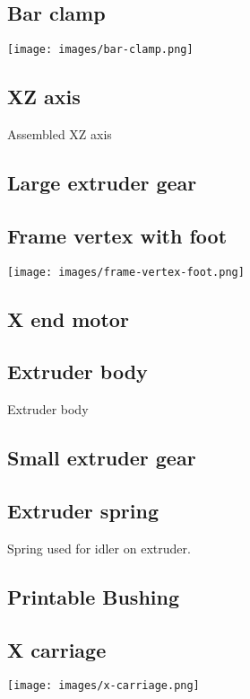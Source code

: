 \documentclass[11pt]{article}
\begin{document}
\hypertarget{thing_bar-clamp}{\subsection{Bar clamp}}
\texttt{[image: images/bar-clamp.png]}

\hypertarget{thing_xz-axis}{\subsection{XZ axis}}
Assembled XZ axis

\hypertarget{thing_large-gear}{\subsection{Large extruder gear}}

\hypertarget{thing_frame-vertex-foot}{\subsection{Frame vertex with foot}}
\texttt{[image: images/frame-vertex-foot.png]}

\hypertarget{thing_x-end-motor}{\subsection{X end motor}}

\hypertarget{thing_extruder-body}{\subsection{Extruder body}}
Extruder body

\hypertarget{thing_small-gear}{\subsection{Small extruder gear}}

\hypertarget{thing_extruder-spring}{\subsection{Extruder spring}}
Spring used for idler on extruder.

\hypertarget{thing_printable-bushing}{\subsection{Printable Bushing}}

\hypertarget{thing_x-carriage}{\subsection{X carriage}}
\texttt{[image: images/x-carriage.png]}
\end{document}

